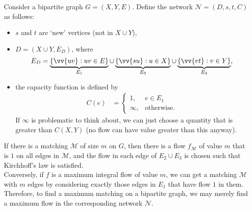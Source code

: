 			Consider a bipartite graph $G = (X,Y,E)$. Define the network $\mathcal{N} = (D,s,t,C)$ as follows:
			\begin{itemize}
				\item $s$ and $t$ are `new' vertices (not in $X\cup Y$),
				\item $D = (X\cup Y, E_D)$, where
				\[ E_D = \underbrace{\{\vv{uv} : uv \in E\}}_{E_1} \cup \underbrace{\{ \vv{su} : u \in X \}}_{E_2} \cup \underbrace{\{ \vv{vt} : v \in Y \}}_{E_3}, \]
				\item the capacity function is defined by
				\begin{align*}
					C(e) &=
					\begin{cases}
						1, & e \in E_1 \\
						\infty, & \text{otherwise}.
					\end{cases}
				\end{align*}
				If $\infty$ is problematic to think about, we can just choose a quantity that is greater than $C(X,Y)$ (no flow can have value greater than this anyway).
			\end{itemize}
			If there is a matching $\mathcal{M}$ of size $m$ on $G$, then there is a flow $f_\mathcal{M}$ of value $m$ that is $1$ on all edges in $\mathcal{M}$, and the flow in each edge of $E_2 \cup E_3$ is chosen such that Kirchhoff's law is satisfied.\\
			Conversely, if $f$ is a maximum integral flow of value $m$, we can get a matching $\mathcal{M}$ with $m$ edges by considering exactly those edges in $E_1$ that have flow $1$ in them.\\
			Therefore, to find a maximum matching on a bipartite graph, we may merely find a maximum flow in the corresponding network $\mathcal{N}$.\\

